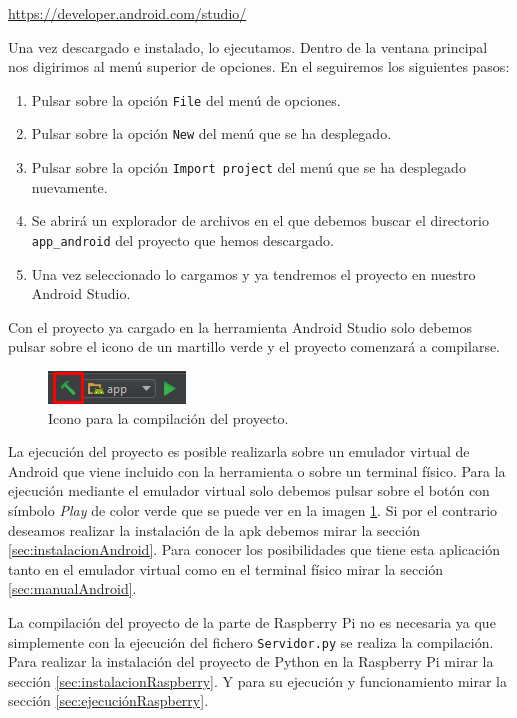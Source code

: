 \url{https://developer.android.com/studio/}

Una vez descargado e instalado, lo ejecutamos. Dentro de la ventana principal nos digirimos al menú superior de opciones. En el seguiremos los siguientes pasos:
\begin{enumerate}
	\item Pulsar sobre la opción \verb|File| del menú de opciones.
	\item Pulsar sobre la opción \verb|New| del menú que se ha desplegado.
	\item Pulsar sobre la opción \verb|Import project| del menú que se ha desplegado nuevamente.
	\item Se abrirá un explorador de archivos en el que debemos buscar el directorio \verb|app_android| del proyecto que hemos descargado.
	\item Una vez seleccionado lo cargamos y ya tendremos el proyecto en nuestro Android Studio.
\end{enumerate}

Con el proyecto ya cargado en la herramienta Android Studio solo debemos pulsar sobre el icono de un martillo verde y el proyecto comenzará a compilarse.

\begin{figure}[h!]
	\centering
	\includegraphics[width=0.4\linewidth]{img/martillo}
	\caption{Icono para la compilación del proyecto.}
	\label{fig:martillo}
\end{figure}

La ejecución del proyecto es posible realizarla sobre un emulador virtual de Android que viene incluido con la herramienta o sobre un terminal físico. Para la ejecución mediante el emulador virtual solo debemos pulsar sobre el botón con símbolo \textit{Play} de color verde que se puede ver en la imagen \ref{fig:martillo}. Si por el contrario deseamos realizar la instalación de la apk debemos mirar la sección \ref{sec:instalacionAndroid}. Para conocer los posibilidades que tiene esta aplicación tanto en el emulador virtual como en el terminal físico mirar la sección \ref{sec:manualAndroid}.

La compilación del proyecto de la parte de Raspberry Pi no es necesaria ya que simplemente con la ejecución del fichero \verb|Servidor.py| se realiza la compilación. Para realizar la instalación del proyecto de Python en la Raspberry Pi mirar la sección \ref{sec:instalacionRaspberry}. Y para su ejecución y funcionamiento mirar la sección \ref{sec:ejecuciónRaspberry}.

